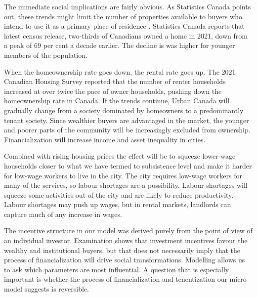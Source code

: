 The immediate social implications are fairly obvious. As Statistics Canada points out, these trends might limit the number of properties available to buyers who intend to use it as a primary place of residence  \cite{fontaineResidentialRealEstate2023}. Statistics Canada reports that latest census release, two-thirds of Canadians owned a home in 2021, down from a peak of 69 per cent a decade earlier. The decline is was higher for younger members of the population. 

When the homeownership rate goes down, the rental rate goes up. The 2021 Canadian Housing Survey reported that the number of renter households increased  at over twice the pace of owner households, pushing down the homeownership rate in Canada. If the trends continue, Urban Canada will gradually change from a society dominated by homeowners to a predominantly tenant society. Since wealthier buyers are advantaged in the market, the younger and poorer parts of the community will be increasingly excluded from ownership. Financialization will increase income and asset inequality in cities.

Combined with rising housing prices the effect will be to squeeze lower-wage households closer to what we have termed to subsistence level and make it harder for low-wage workers to live in the city. The city requires low-wage workers for many of the services, so labour shortages are a possibility. Labour shortages will squeeze some activities out of the city and are likely to reduce productivity. Labour shortages may push up wages, but in rental markets, landlords can capture much of any increase in wages. 

The incentive structure in our model was derived purely from the point of view of an individual investor. Examination shows that investment incentives favour the wealthy and institutional buyers, but that does not necessarily imply that the process of financialization will drive social transformations. %
Modelling  allows us to ask %
which parameters are most influential. 
A question that is especially important is whether the process of financialization and tenentization our micro model suggests is reversible.%









